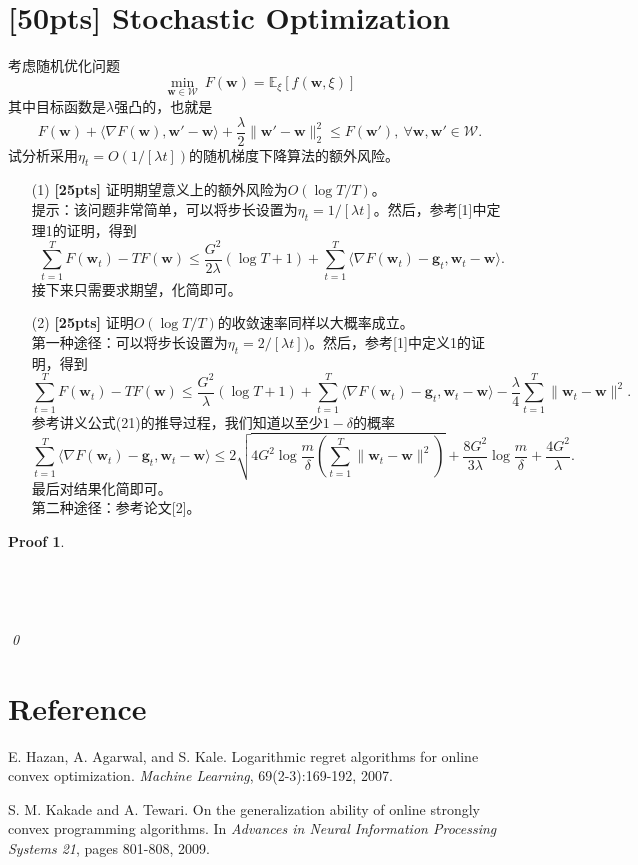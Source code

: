 \documentclass[a4paper,UTF8]{article}
\numberwithin{equation}{section}
\newtheorem*{myProof}{Proof}
\begin{document}
\section{[50pts] Stochastic Optimization}
\noindent 考虑随机优化问题
\[
\min_{\mathbf{w} \in \mathcal{W}} \ F(\mathbf{w})= \mathbb{E}_{\xi} \left[ f(\mathbf{w}, \xi) \right]
\]
其中目标函数是$\lambda$强凸的，也就是
\begin{equation}\label{eqn:strong}
F(\mathbf{w}) + \langle \nabla F(\mathbf{w}), \mathbf{w}'-\mathbf{w}  \rangle + \frac{\lambda}{2} \|\mathbf{w}'-\mathbf{w}\|_2^2 \leq F(\mathbf{w}'), \ \forall \mathbf{w}, \mathbf{w}' \in \mathcal{W}.
\end{equation}
试分析采用$\eta_t=O(1/[\lambda t])$的随机梯度下降算法的额外风险。
\begin{enumerate}
  \item[(1)] \textbf{[25pts]} 证明期望意义上的额外风险为$O(\log T/T)$。\\
  提示：该问题非常简单，可以将步长设置为$\eta_t=1/[\lambda t]$。然后，参考[1]中定理1的证明，得到
\[
 \sum_{t=1}^T F(\mathbf{w}_{t}) - T F(\mathbf{w}) \leq \frac{G^2}{2 \lambda} (\log T+1) + \sum_{t=1}^T \langle \nabla F(\mathbf{w}_t)-\mathbf{g}_t, \mathbf{w}_t - \mathbf{w} \rangle.
\]
接下来只需要求期望，化简即可。
  \item[(2)] \textbf{[25pts]} 证明$O(\log T/T)$的收敛速率同样以大概率成立。\\
第一种途径：可以将步长设置为$\eta_t=2/[\lambda t])$。然后，参考[1]中定义1的证明，得到
\[
 \sum_{t=1}^T F(\mathbf{w}_{t}) - T F(\mathbf{w}) \leq    \frac{G^2}{\lambda}(\log T+1) +\sum_{t=1}^T \langle \nabla F(\mathbf{w}_t)-\mathbf{g}_t, \mathbf{w}_t - \mathbf{w} \rangle- \frac{\lambda}{4} \sum_{t=1}^T \|\mathbf{w}_t - \mathbf{w}\|^2.
\]
参考讲义公式(21)的推导过程，我们知道以至少$1-\delta$的概率
 \[
 \sum_{t=1}^T \langle \nabla F(\mathbf{w}_t)-\mathbf{g}_t, \mathbf{w}_t - \mathbf{w} \rangle \leq  2\sqrt{ 4 G^2  \log \frac{m }{\delta} \left( \sum_{t=1}^T \|\mathbf{w}_t - \mathbf{w}\|^2\right)} +  \frac{8G^2}{3\lambda}   \log \frac{m }{\delta} + \frac{4G^2}{\lambda} .
\]
最后对结果化简即可。\\
第二种途径：参考论文[2]。
\end{enumerate}
\begin{myProof}~\\
	~\\
	~\\
	~\\
	~\\	
	\qed
\end{myProof}
\newpage
\section*{Reference}
\begin{enumerate}[ {[}1{]}]
\item E. Hazan, A. Agarwal, and S. Kale. Logarithmic regret algorithms for online convex optimization. \textit{Machine Learning}, 69(2-3):169-192, 2007.
\item S. M. Kakade and A. Tewari. On the generalization ability of online strongly convex programming algorithms. In \textit{Advances in Neural Information Processing Systems 21}, pages 801-808, 2009.
\end{enumerate}
\end{document}
